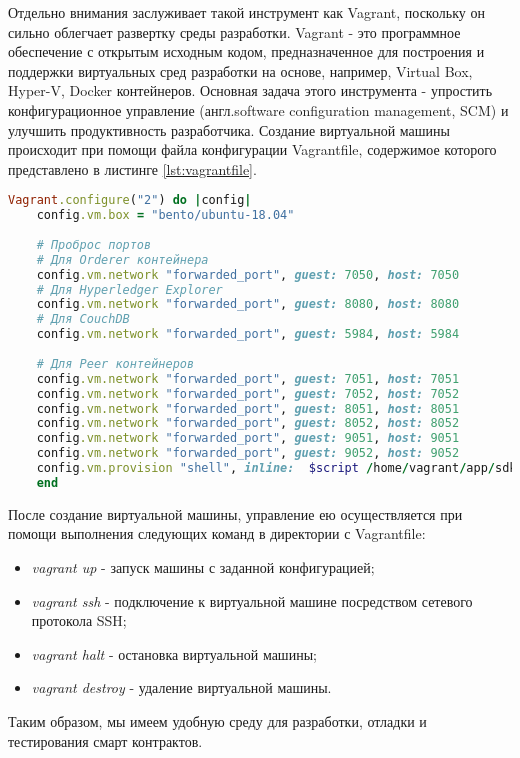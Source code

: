 Отдельно внимания заслуживает такой инструмент как Vagrant, поскольку он сильно облегчает развертку среды разработки. 
Vagrant - это программное обеспечение с открытым исходным кодом, предназначенное для построения и поддержки виртуальных сред разработки на основе, например, Virtual Box, Hyper-V, Docker контейнеров. Основная задача этого инструмента - упростить конфигурационное управление (англ.software configuration management, SCM) \cite{scm} и улучшить продуктивность разработчика. 
Создание виртуальной машины происходит при помощи файла конфигурации Vagrantfile, содержимое которого представлено в листинге \ref{lst:vagrantfile}.

\begin{lstlisting}[caption={Конфигурация виртуальной машины: Vagrantfile},label={lst:vagrantfile},language=Ruby]
	Vagrant.configure("2") do |config|
	config.vm.box = "bento/ubuntu-18.04"
	
	# Проброс портов
	# Для Orderer контейнера
	config.vm.network "forwarded_port", guest: 7050, host: 7050
	# Для Hyperledger Explorer
	config.vm.network "forwarded_port", guest: 8080, host: 8080
	# Для CouchDB
	config.vm.network "forwarded_port", guest: 5984, host: 5984
	
	# Для Peer контейнеров
	config.vm.network "forwarded_port", guest: 7051, host: 7051
	config.vm.network "forwarded_port", guest: 7052, host: 7052
	config.vm.network "forwarded_port", guest: 8051, host: 8051
	config.vm.network "forwarded_port", guest: 8052, host: 8052
	config.vm.network "forwarded_port", guest: 9051, host: 9051
	config.vm.network "forwarded_port", guest: 9052, host: 9052
	config.vm.provision "shell", inline:  $script /home/vagrant/app/sdk/vagrant_node_modules
	end
\end{lstlisting}


После создание виртуальной машины, управление ею осуществляется при помощи выполнения следующих команд в директории с Vagrantfile:
\begin{itemize}
	\item \textit{vagrant up} - запуск машины с заданной конфигурацией;
	\item \textit{vagrant ssh} - подключение к виртуальной машине посредством сетевого протокола SSH;
	\item \textit{vagrant halt} - остановка виртуальной машины;
	\item \textit{vagrant destroy} - удаление виртуальной машины.
\end{itemize}
Таким образом, мы имеем удобную среду для разработки, отладки и тестирования смарт контрактов.

